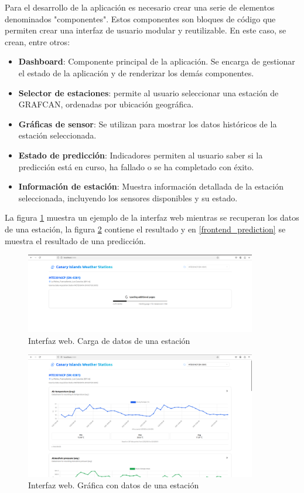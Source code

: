 Para el desarrollo de la aplicación es necesario crear una serie de elementos denominados "componentes". Estos componentes son bloques de código que 
permiten crear una interfaz de usuario modular y reutilizable. En este caso, se crean, entre otros:
\begin{itemize}
    \item \textbf{Dashboard}: Componente principal de la aplicación. Se encarga de gestionar el estado de la aplicación y de renderizar los demás componentes.
    \item \textbf{Selector de estaciones}: permite al usuario seleccionar una estación de GRAFCAN, ordenadas por ubicación geográfica.
    \item \textbf{Gráficas de sensor}: Se utilizan para mostrar los datos históricos de la estación seleccionada. 
    \item \textbf{Estado de predicción}: Indicadores permiten al usuario saber si la predicción está en curso, ha fallado o se ha completado con éxito.
    \item \textbf{Información de estación}: Muestra información detallada de la estación seleccionada, incluyendo los sensores disponibles y su estado.
\end{itemize}

La figura \ref{frontend_loading} muestra un ejemplo de la interfaz web mientras se recuperan los datos de una estación, la figura 
\ref{frontend_loaded} contiene el resultado y en \ref{frontend_prediction} se muestra el resultado de una predicción.

\begin{figure}[H]
    \centering
    \includegraphics[width=0.9\textwidth]{images/frontend_loading.png}
    \caption{Interfaz web. Carga de datos de una estación}
    \label{frontend_loading}
\end{figure}

\begin{figure}[H]
    \centering
    \includegraphics[width=0.9\textwidth]{images/frontend_loaded.png}
    \caption{Interfaz web. Gráfica con datos de una estación}
    \label{frontend_loaded}
\end{figure}

